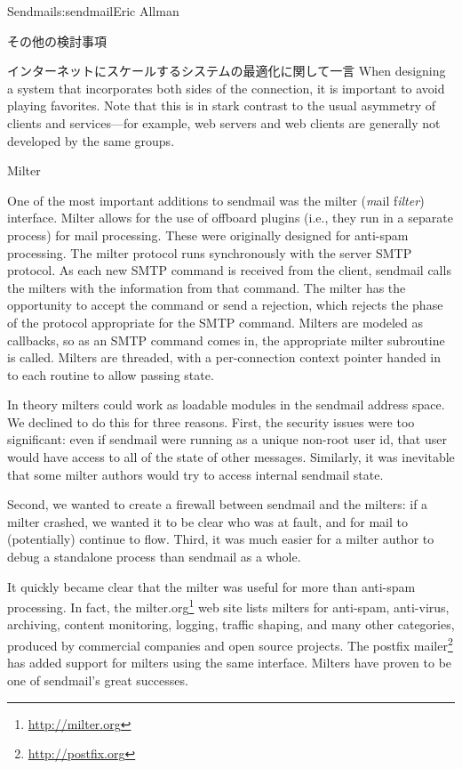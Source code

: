 \begin{aosachapter}{Sendmail}{s:sendmail}{Eric Allman}
\begin{aosasect1}{その他の検討事項}
\begin{aosasect2}{インターネットにスケールするシステムの最適化に関して一言}
When designing a system that incorporates both sides of the
connection, it is important to avoid playing favorites. Note that this
is in stark contrast to the usual asymmetry of clients and
services---for example, web servers and web clients are generally not
developed by the same groups.

\end{aosasect2}

\begin{aosasect2}{Milter}

One of the most important additions to sendmail was the milter
(\emph{m}ail f\emph{ilter}) interface.  Milter allows for the use of
offboard plugins (i.e., they run in a separate process) for mail
processing. These were originally designed for anti-spam
processing. The milter protocol runs synchronously with the server
SMTP protocol. As each new SMTP command is received from the client,
sendmail calls the milters with the information from that command. The
milter has the opportunity to accept the command or send a rejection,
which rejects the phase of the protocol appropriate for the SMTP
command. Milters are modeled as callbacks, so as an SMTP command comes
in, the appropriate milter subroutine is called. Milters are threaded,
with a per-connection context pointer handed in to each routine to
allow passing state.

In theory milters could work as loadable modules in the sendmail
address space. We declined to do this for three reasons.  First, the
security issues were too significant: even if sendmail were running as
a unique non-root user id, that user would have access to all of the
state of other messages.  Similarly, it was inevitable that some milter
authors would try to access internal sendmail state.

Second, we wanted to create a firewall between sendmail and the
milters: if a milter crashed, we wanted it to be clear who was at
fault, and for mail to (potentially) continue to flow. Third, it was
much easier for a milter author to debug a standalone process than
sendmail as a whole.

It quickly became clear that the milter was useful for more than
anti-spam processing. In fact, the milter.org\footnote{\url{http://milter.org}}
web site lists milters
for anti-spam, anti-virus, archiving, content monitoring, logging,
traffic shaping, and many other categories, produced by commercial
companies and open source projects. The postfix
mailer\footnote{\url{http://postfix.org}}
has added
support for milters using the same interface. Milters have proven to
be one of sendmail's great successes.


\end{aosasect2}
\end{aosasect1}
\end{aosachapter}
